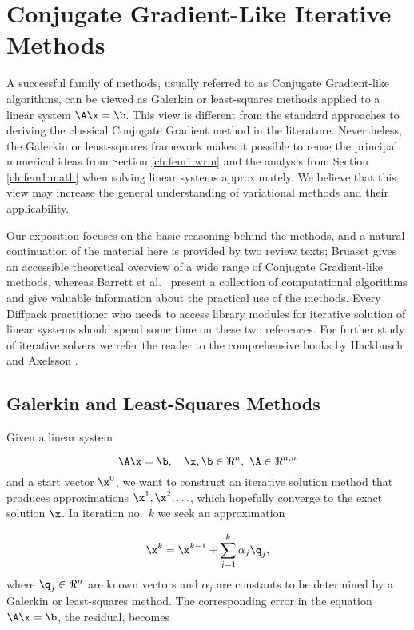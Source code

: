 \section{Conjugate Gradient-Like Iterative Methods}
\label{ch:linalg:CGmethods}
A successful family of methods, usually referred to as Conjugate Gradient-like
algorithms, can be viewed as Galerkin or least-squares methods applied
to a linear system $\A\x =\b$.
This view is different from the standard approaches to deriving
the classical Conjugate Gradient method in the
literature. Nevertheless, the Galerkin or
least-squares framework makes it possible to reuse the principal
numerical ideas
from Section \ref{ch:fem1:wrm} and the analysis from Section \ref{ch:fem1:math}
when solving linear systems approximately.
We believe that this view may increase the general
understanding of variational methods and their applicability.

Our exposition focuses on the basic reasoning behind the methods,  and
a natural continuation of the material here is provided by
two review texts;
Bruaset \cite{BruBok}
gives an accessible theoretical overview of a wide range
of Conjugate Gradient-like methods, whereas
Barrett et al.~\cite{linalgtemplates93}
present a collection of computational algorithms and give
valuable information about the practical use of the methods.
Every Diffpack practitioner who needs to access
library modules for iterative solution of linear systems should
spend some time on these two references.
For further study of iterative solvers
we refer the reader to the comprehensive
books by Hackbusch \cite{Hackbusch} and Axelsson \cite{Axelsson}.

\subsection{Galerkin and Least-Squares Methods}
Given a linear system

\begin{equation}
\A\x = \b,\quad\x,\b\in\Re^n,\ \A\in\Re^{n,n}
\end{equation}
and a start vector $\x^0$,
we want to construct an iterative solution method that produces approximations
$\x^1,\x^2,\ldots$, which hopefully converge to the exact solution $\x$.
In iteration no.~$k$ we seek an approximation

\begin{equation}
\x^k = \x^{k-1} + \sum_{j=1}^k \alpha_j\q_j,
\label{linalg:xk:update}
\end{equation}
where $\q_j\in\Re^n$ are known vectors and $\alpha_j$ are constants to
be determined by a Galerkin or least-squares method.
The corresponding error in the equation $\A\x =\b$, the residual, becomes

